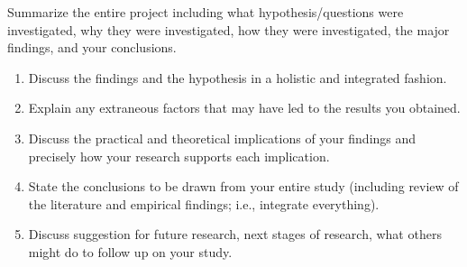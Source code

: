\documentclass[12pt,letterpaper,oneside,oldfontcommands]{memoir}
\providecommand{\tightlist}{%
  \setlength{\itemsep}{0pt}\setlength{\parskip}{0pt}}
\theoremstyle{definition}
\theoremstyle{definition}
\theoremstyle{definition}
\theoremstyle{remark}
\begin{document}
Summarize the entire project including what hypothesis/questions were
investigated, why they were investigated, how they were investigated,
the major findings, and your conclusions.

\begin{enumerate}
\def\labelenumi{\arabic{enumi}.}
\tightlist
\item
  Discuss the findings and the hypothesis in a holistic and integrated
  fashion.
\item
  Explain any extraneous factors that may have led to the results you
  obtained.
\item
  Discuss the practical and theoretical implications of your findings
  and precisely how your research supports each implication.
\item
  State the conclusions to be drawn from your entire study (including
  review of the literature and empirical findings; i.e., integrate
  everything).
\item
  Discuss suggestion for future research, next stages of research, what
  others might do to follow up on your study.
\end{enumerate}

\clearpage


\end{document}
